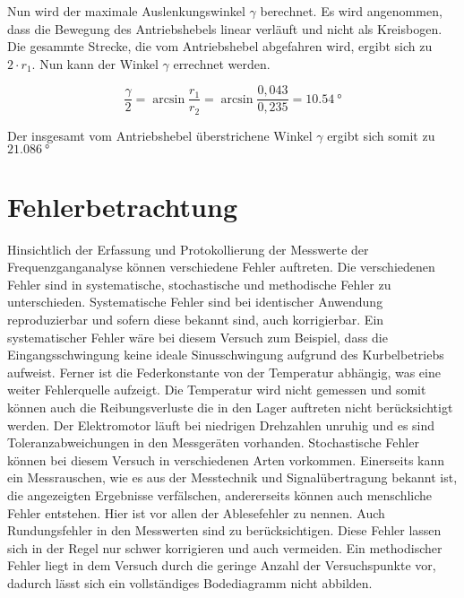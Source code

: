 \documentclass[a4paper,12pt]{scrartcl}
\begin{document}
Nun wird der maximale Auslenkungswinkel $\gamma$ berechnet. Es wird angenommen, dass die Bewegung des Antriebshebels linear verläuft und nicht als Kreisbogen.
Die gesammte Strecke, die vom Antriebshebel abgefahren wird, ergibt sich zu $2 \cdot r_1$. Nun kann der Winkel $\gamma$ errechnet werden.

\begin{equation}
	\frac{\gamma}{2} = \arcsin{\frac{r_1}{r_2}} = \arcsin{\frac{0,043}{0,235}} =  \SI{10,54}{\degree}
\end{equation}

Der insgesamt vom Antriebshebel überstrichene Winkel $\gamma$ ergibt sich somit zu $\SI{21,086}{\degree}$

\section{Fehlerbetrachtung}
Hinsichtlich der Erfassung und Protokollierung der Messwerte der Frequenzganganalyse können verschiedene Fehler auftreten.
Die verschiedenen Fehler sind in systematische, stochastische und methodische Fehler zu unterschieden.
Systematische Fehler sind bei identischer Anwendung reproduzierbar und sofern diese bekannt sind, auch korrigierbar.
Ein systematischer Fehler wäre bei diesem Versuch zum Beispiel, dass die Eingangsschwingung keine ideale Sinusschwingung aufgrund des Kurbelbetriebs aufweist.
Ferner ist die Federkonstante von der Temperatur abhängig, was eine weiter Fehlerquelle aufzeigt.
Die Temperatur wird nicht gemessen und somit können auch die Reibungsverluste die in den Lager auftreten nicht berücksichtigt werden.
Der Elektromotor läuft bei niedrigen Drehzahlen unruhig und es sind Toleranzabweichungen in den Messgeräten vorhanden.
Stochastische Fehler können bei diesem Versuch in verschiedenen Arten vorkommen. Einerseits kann ein Messrauschen,
wie es aus der Messtechnik und Signalübertragung bekannt ist, die angezeigten Ergebnisse verfälschen, andererseits können auch menschliche Fehler entstehen.
Hier ist vor allen der Ablesefehler zu nennen. Auch Rundungsfehler in den Messwerten sind zu berücksichtigen.
Diese Fehler lassen sich in der Regel nur schwer korrigieren und auch vermeiden.
Ein methodischer Fehler liegt in dem Versuch durch die geringe Anzahl der Versuchspunkte vor, dadurch lässt sich ein vollständiges Bodediagramm nicht abbilden.
\end{document}
